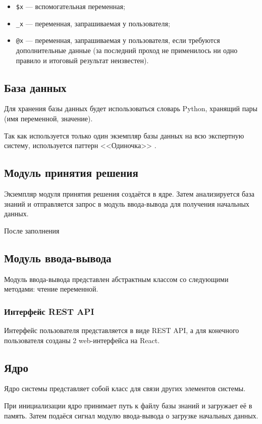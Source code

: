 \begin{itemize}
	\item \texttt{\$x} --- вспомогательная переменная;
	\item \texttt{\_x} --- переменная, запрашиваемая у пользователя;
	\item \texttt{@x} --- переменная, запрашиваемая у пользователя, если требуются дополнительные данные (за последний проход не применилось ни одно правило и итоговый результат неизвестен).
\end{itemize}

\subsection{База данных}

Для хранения базы данных будет использоваться словарь Python, хранящий пары (имя переменной, значение).

Так как используется только один экземпляр базы данных на всю экспертную систему, используется паттерн <<Одиночка>> \cite{gammaDesignPatternsElements1995}.

\subsection{Модуль принятия решения}

Экземпляр модуля принятия решения создаётся в ядре.
Затем анализируется база знаний и отправляется запрос в модуль ввода-вывода для получения начальных данных.

После заполнения

\subsection{Модуль ввода-вывода}

Модуль ввода-вывода представлен абстрактным классом со следующими методами: чтение переменной.

\subsubsection{Интерфейс REST API}

Интерфейс пользователя представляется в виде REST API, а для конечного пользователя созданы 2 web-интерфейса на React.

\subsection{Ядро}

Ядро системы представляет собой класс для связи других элементов системы.

При инициализации ядро принимает путь к файлу базы знаний и загружает её в память.
Затем подаёся сигнал модулю ввода-вывода о загрузке начальных данных.
